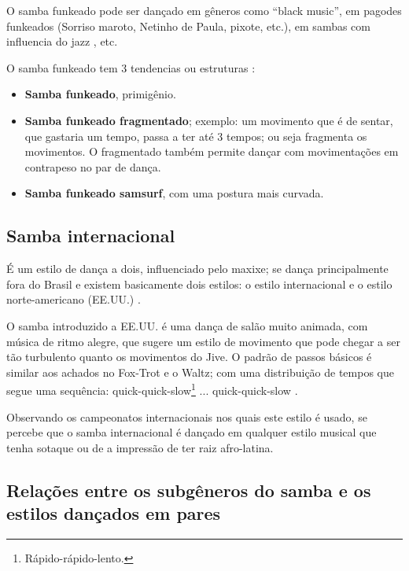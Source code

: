 O samba funkeado pode ser dançado em gêneros como ``black music'',
em pagodes funkeados (Sorriso maroto, Netinho de Paula, pixote, etc.), 
em sambas com influencia do jazz \cite{sambafunkeadoJimmyDeOliveiraPart3}, etc.

O samba funkeado tem 3 tendencias ou estruturas  \cite{sambafunkeadoJimmyDeOliveiraPart2}:
\begin{itemize}
\item \textbf{Samba funkeado}, primigênio.
\item \textbf{Samba funkeado fragmentado}; exemplo: um movimento que é de sentar, que gastaria um tempo, 
passa a ter até 3 tempos; ou seja fragmenta os movimentos. 
O fragmentado também permite dançar com movimentações em contrapeso no par de dança.
\item \textbf{Samba funkeado samsurf}, com uma postura mais curvada.
\end{itemize}

 
\subsection{Samba internacional}
\label{subsec:DancaSambaInternacional} 
É um estilo de dança a dois, influenciado pelo maxixe;
se dança principalmente fora do Brasil e existem basicamente dois estilos: 
o estilo internacional e o estilo norte-americano (EE.UU.) \cite[pp. 134-135]{perna2002samba}.

O samba introduzido a EE.UU. é uma dança de salão muito animada, 
com música de ritmo alegre, que sugere um estilo de movimento que pode
chegar a ser tão turbulento quanto os movimentos do Jive.
O padrão de passos básicos é similar aos achados no Fox-Trot e o Waltz;
com uma distribuição de tempos que segue uma sequência: 
quick-quick-slow\footnote{Rápido-rápido-lento.} ... quick-quick-slow \cite{parson2016ballroom}.

Observando os campeonatos internacionais nos quais este estilo é usado, 
se percebe que o samba internacional é dançado em qualquer estilo musical que
tenha sotaque ou de a impressão de ter raiz afro-latina.

\subsection{Relações entre os subgêneros do samba e os estilos dançados em pares}

